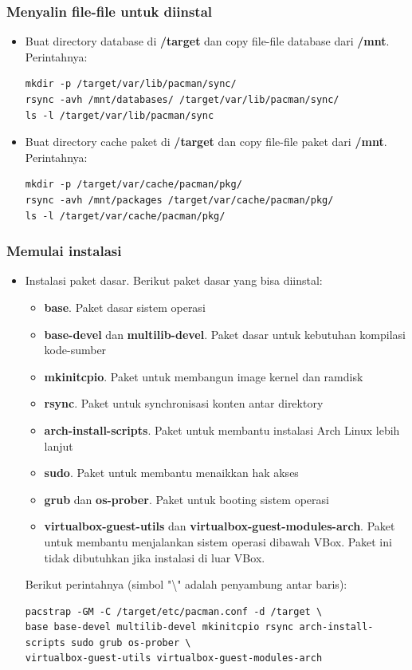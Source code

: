 \documentclass[12pt,]{article}
\begin{document}
	\subsubsection{Menyalin file-file untuk diinstal}
	\begin{itemize}
	\item Buat directory database di \textbf{/target} dan copy file-file database dari \textbf{/mnt}.
		Perintahnya:
		\begin{verbatim}
mkdir -p /target/var/lib/pacman/sync/
rsync -avh /mnt/databases/ /target/var/lib/pacman/sync/
ls -l /target/var/lib/pacman/sync
		\end{verbatim}
		
		\item Buat directory cache paket di \textbf{/target} dan copy file-file paket dari \textbf{/mnt}.
		Perintahnya:
		\begin{verbatim}
mkdir -p /target/var/cache/pacman/pkg/
rsync -avh /mnt/packages /target/var/cache/pacman/pkg/
ls -l /target/var/cache/pacman/pkg/
		\end{verbatim}
	\end{itemize}

	\subsubsection{Memulai instalasi}
	\begin{itemize}
		\item Instalasi paket dasar.
		Berikut paket dasar yang bisa diinstal:
		\begin{itemize}
			\item \textbf{base}. Paket dasar sistem operasi
			\item \textbf{base-devel} dan \textbf{multilib-devel}. Paket dasar untuk kebutuhan kompilasi kode-sumber
			\item \textbf{mkinitcpio}. Paket untuk membangun image kernel dan ramdisk
			\item \textbf{rsync}. Paket untuk synchronisasi konten antar direktory
			\item \textbf{arch-install-scripts}. Paket untuk membantu instalasi Arch Linux lebih lanjut
			\item \textbf{sudo}. Paket untuk membantu menaikkan hak akses
			\item \textbf{grub} dan \textbf{os-prober}. Paket untuk booting sistem operasi
			\item \textbf{virtualbox-guest-utils} dan \textbf{virtualbox-guest-modules-arch}.
			Paket untuk membantu menjalankan sistem operasi dibawah VBox.
			Paket ini tidak dibutuhkan jika instalasi di luar VBox.
		\end{itemize}
		Berikut perintahnya (simbol "\textbackslash" adalah penyambung antar baris):
		\begin{verbatim}
pacstrap -GM -C /target/etc/pacman.conf -d /target \
base base-devel multilib-devel mkinitcpio rsync arch-install-scripts sudo grub os-prober \
virtualbox-guest-utils virtualbox-guest-modules-arch
		\end{verbatim}
	\end{itemize}
\end{document}

